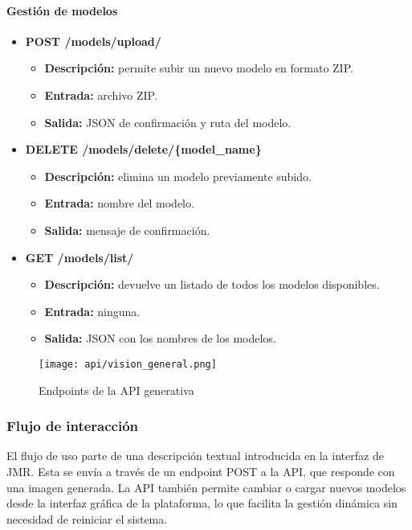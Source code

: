 \paragraph{Gestión de modelos}
\begin{itemize}
    \item \textbf{POST /models/upload/}
    \begin{itemize}
        \item \textbf{Descripción:} permite subir un nuevo modelo en formato ZIP.
        \item \textbf{Entrada:} archivo ZIP.
        \item \textbf{Salida:} JSON de confirmación y ruta del modelo.
    \end{itemize}

    \item \textbf{DELETE /models/delete/\{model\_name\}}
    \begin{itemize}
        \item \textbf{Descripción:} elimina un modelo previamente subido.
        \item \textbf{Entrada:} nombre del modelo.
        \item \textbf{Salida:} mensaje de confirmación.
    \end{itemize}

    \item \textbf{GET /models/list/}
    \begin{itemize}
        \item \textbf{Descripción:} devuelve un listado de todos los modelos disponibles.
        \item \textbf{Entrada:} ninguna.
        \item \textbf{Salida:} JSON con los nombres de los modelos.
    \end{itemize}
\end{itemize}

\begin{figure}[H]
\centering
\texttt{[image: api/vision\_general.png]}
\caption{Endpoints de la API generativa}
\label{fig:api-endpoints}
\end{figure}

\subsubsection{Flujo de interacción}

El flujo de uso parte de una descripción textual introducida en la interfaz de JMR. Esta se envía a través de un endpoint POST a la API, que responde con una imagen generada. La API también permite cambiar o cargar nuevos modelos desde la interfaz gráfica de la plataforma, lo que facilita la gestión dinámica sin necesidad de reiniciar el sistema.

